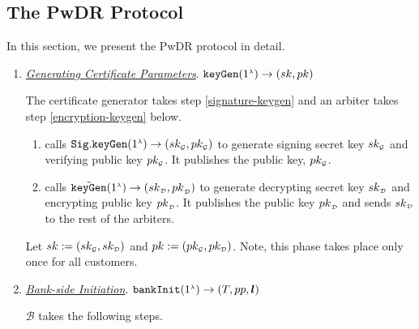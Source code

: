 \subsection{The PwDR Protocol}
In this section, we present the PwDR protocol in detail. 





\begin{enumerate}

\item \underline{\textit{Generating  Certificate Parameters}}.  $\mathtt{keyGen}(1^{\scriptscriptstyle \lambda})\rightarrow (sk,pk)$

The certificate generator  takes   step \ref{signature-keygen} and an arbiter takes step \ref{encryption-keygen} below. 

\begin{enumerate}
\item\label{signature-keygen} calls $\mathtt{Sig.keyGen}(1^{\scriptscriptstyle \lambda})\rightarrow (sk_{\scriptscriptstyle\mathcal{G}}, pk_{\scriptscriptstyle\mathcal{G}})$ to generate  signing secret key $sk_{\scriptscriptstyle\mathcal{G}}$ and  verifying public key $pk_{\scriptscriptstyle\mathcal{G}}$. It publishes the public key, $pk_{\scriptscriptstyle\mathcal{G}}$.
%
\item\label{encryption-keygen} calls $\tilde{\mathtt{keyGen}}(1^{\scriptscriptstyle\lambda})\rightarrow({sk}_{\scriptscriptstyle\mathcal {D}}, {pk}_{\scriptscriptstyle\mathcal {D}})$ to generate  decrypting secret key ${sk}_{\scriptscriptstyle\mathcal {D}}$ and encrypting public key ${pk}_{\scriptscriptstyle\mathcal {D}}$. It publishes the public key ${pk}_{\scriptscriptstyle\mathcal {D}}$ and sends ${sk}_{\scriptscriptstyle\mathcal {D}}$ to the rest of the arbiters.
\end{enumerate}


Let $sk:=(sk_{\scriptscriptstyle\mathcal{G}}, sk_{\scriptscriptstyle\mathcal{D}})$ and $pk:=(pk_{\scriptscriptstyle\mathcal{G}}, pk_{\scriptscriptstyle\mathcal{D}})$. Note, this   phase takes place only once for all customers.

\item\label{RCPoRP::Bank-side-Initiation} \underline{\textit{Bank-side Initiation}}. $\mathtt{bankInit}(1^{\scriptscriptstyle \lambda})\rightarrow (T, pp, \bm l)$

$\mathcal{B}$ takes the following steps. 
\begin{enumerate}


\end{enumerate}
\end{enumerate}
